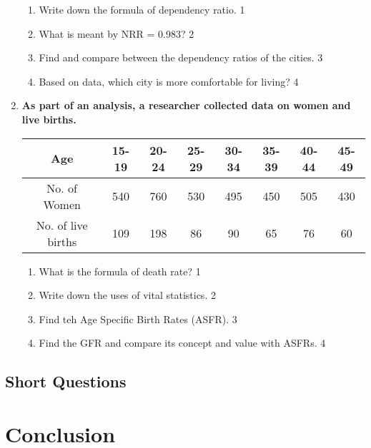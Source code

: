 \documentclass[a4paper,oneside, margin=1.4in]{book}
\begin{document}
\begin{enumerate}
  \begin{enumerate}
    \item
	Write down the formula of dependency ratio. \hfill 1
    \item
	What is meant by NRR = 0.983? \hfill 2
    \item  
	Find and compare between the dependency ratios of the cities. \hfill 3
    \item
	Based on data, which city is more comfortable for living? \hfill 4
  \end{enumerate}
  
   \item
	  \textbf{As part of an analysis, a researcher collected data on women and live births.} 
	  \begin{table}[h]
	  \centering
\begin{tabular}{c|c|c|c|c|c|c|c}
Age & 15-19 & 20-24 & 25-29 & 30-34 & 35-39 & 40-44 & 45-49 \\ \hline
No. of Women & 540 & 760 & 530 & 495 & 450 & 505 & 430 \\ \hline
No. of live births & 109 & 198 & 86 & 90 & 65 & 76 & 60
\end{tabular}
\end{table}
  
  \begin{enumerate}
    \item
	What is the formula of death rate? \hfill 1
    \item
	Write down the uses of vital statistics. \hfill 2
    \item  
	Find teh Age Specific Birth Rates (ASFR). \hfill 3
    \item
	Find the GFR and compare its concept and value with ASFRs. \hfill 4
  \end{enumerate}
  
  \end{enumerate}

\section{Short Questions}

\backmatter
\chapter{Conclusion}
\lipsum[8]

\tableofcontents
\end{document}
